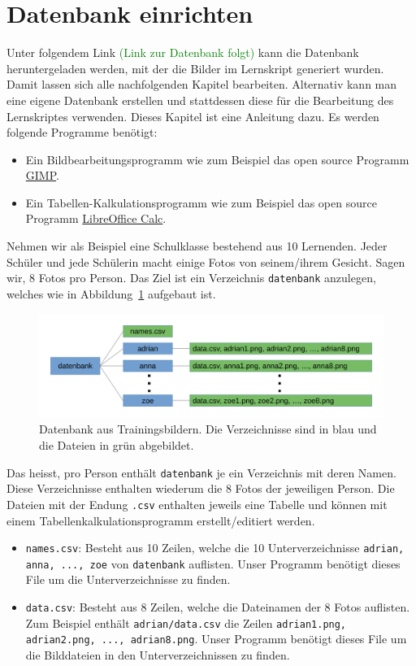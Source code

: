 \section{Datenbank einrichten} \label{sec:database}
Unter folgendem Link \textcolor{green}{(Link zur Datenbank folgt)} kann die Datenbank heruntergeladen werden, mit der die Bilder im Lernskript generiert wurden.
Damit lassen sich alle nachfolgenden Kapitel bearbeiten.
Alternativ kann man eine eigene Datenbank erstellen und stattdessen diese für die Bearbeitung des Lernskriptes verwenden.
Dieses Kapitel ist eine Anleitung dazu.
Es werden folgende Programme benötigt:
\begin{itemize}
	\item Ein Bildbearbeitungsprogramm wie zum Beispiel das open source Programm \href{https://www.gimp.org/}{GIMP}.
	\item Ein Tabellen-Kalkulationsprogramm wie zum Beispiel das open source Programm \href{https://de.libreoffice.org/discover/calc/}{LibreOffice Calc}.
\end{itemize}
Nehmen wir als Beispiel eine Schulklasse bestehend aus 10 Lernenden.
Jeder Schüler und jede Schülerin macht einige Fotos von seinem/ihrem Gesicht.
Sagen wir, 8 Fotos pro Person.
Das Ziel ist ein Verzeichnis \texttt{datenbank} anzulegen, welches wie in Abbildung~\ref{fig:database} aufgebaut ist.
\begin{figure}[ht]
	\centering
	\includegraphics[width=\textwidth]{images/database}
	\caption{Datenbank aus Trainingsbildern. Die Verzeichnisse sind in blau und die Dateien in grün abgebildet.}
	\label{fig:database}
\end{figure}
Das heisst, pro Person enthält \texttt{datenbank} je ein Verzeichnis mit deren Namen.
Diese Verzeichnisse enthalten wiederum die 8 Fotos der jeweiligen Person.
Die Dateien mit der Endung \texttt{.csv} enthalten jeweils eine Tabelle und können mit einem Tabellenkalkulationsprogramm erstellt/editiert werden.
\begin{itemize}
	\item \texttt{names.csv}: Besteht aus 10 Zeilen, welche die 10 Unterverzeichnisse \texttt{adrian, anna, ..., zoe} von \texttt{datenbank} auflisten.
	Unser Programm benötigt dieses File um die Unterverzeichnisse zu finden.
	\item \texttt{data.csv}: Besteht aus 8 Zeilen, welche die Dateinamen der 8 Fotos auflisten.
	Zum Beispiel enthält \texttt{adrian/data.csv} die Zeilen \texttt{adrian1.png, adrian2.png, ..., adrian8.png}.
	Unser Programm benötigt dieses File um die Bilddateien in den Unterverzeichnissen zu finden.
\end{itemize}
